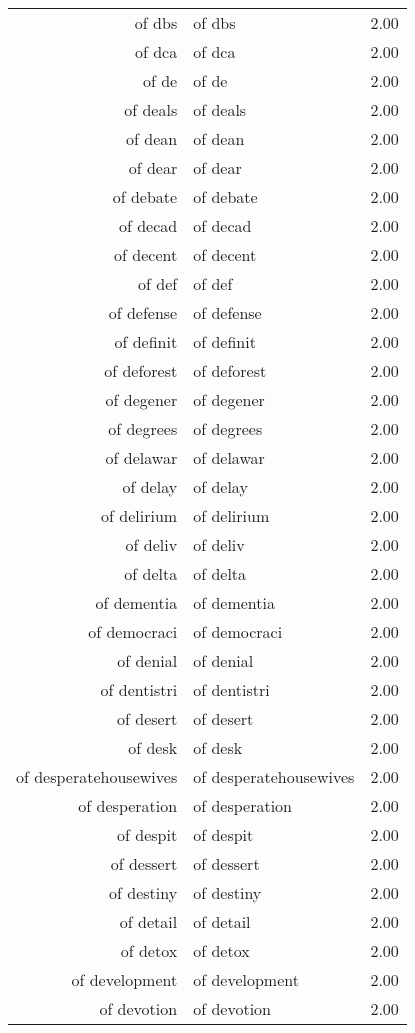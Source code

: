 \begin{table}[ht]
\begin{tabular}{rlr}
  of dbs & of dbs & 2.00 \\ 
  of dca & of dca & 2.00 \\ 
  of de & of de & 2.00 \\ 
  of deals & of deals & 2.00 \\ 
  of dean & of dean & 2.00 \\ 
  of dear & of dear & 2.00 \\ 
  of debate & of debate & 2.00 \\ 
  of decad & of decad & 2.00 \\ 
  of decent & of decent & 2.00 \\ 
  of def & of def & 2.00 \\ 
  of defense & of defense & 2.00 \\ 
  of definit & of definit & 2.00 \\ 
  of deforest & of deforest & 2.00 \\ 
  of degener & of degener & 2.00 \\ 
  of degrees & of degrees & 2.00 \\ 
  of delawar & of delawar & 2.00 \\ 
  of delay & of delay & 2.00 \\ 
  of delirium & of delirium & 2.00 \\ 
  of deliv & of deliv & 2.00 \\ 
  of delta & of delta & 2.00 \\ 
  of dementia & of dementia & 2.00 \\ 
  of democraci & of democraci & 2.00 \\ 
  of denial & of denial & 2.00 \\ 
  of dentistri & of dentistri & 2.00 \\ 
  of desert & of desert & 2.00 \\ 
  of desk & of desk & 2.00 \\ 
  of desperatehousewives & of desperatehousewives & 2.00 \\ 
  of desperation & of desperation & 2.00 \\ 
  of despit & of despit & 2.00 \\ 
  of dessert & of dessert & 2.00 \\ 
  of destiny & of destiny & 2.00 \\ 
  of detail & of detail & 2.00 \\ 
  of detox & of detox & 2.00 \\ 
  of development & of development & 2.00 \\ 
  of devotion & of devotion & 2.00 \\ 

\end{tabular}
\end{table}

